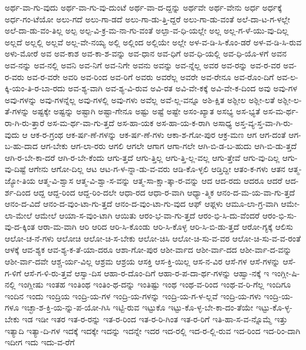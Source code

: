 {ಅರ್ಥ-ವಾ-ಗು-ವುದು
ಅರ್ಥ-ವಾ-ಗು-ವು-ದುಂಟೆ
ಅರ್ಥ-ವಾ-ದ-ದ್ದನ್ನು
ಅರ್ಥವೇ
ಅರ್ಥ-ವೇನು
ಅರ್ಧ
ಅರ್ಧಕ್ಕೆ
ಅರ್ಧ-ಗಂ-ಟೆಯೋ
ಅಲು-ಗದೆ
ಅಲು-ಗಾ-ಡದೆ
ಅಲು-ಗಾ-ಡು-ತ್ತಿ-ದ್ದರೆ
ಅಲು-ಗಾ-ಡು-ವಂತೆ
ಅಲೆ-ದಾ-ಟ-ಗ-ಳಲ್ಲೇ
ಅಲೆ-ದಾ-ಡು-ವಂ-ತಿಲ್ಲ
ಅಲ್ಪ
ಅಲ್ಪ-ವಿ-ಕ್ರ-ಮ-ನಾ-ಗು-ವಂತೆ
ಅಲ್ಪಾ-ವ-ಧಿ-ಯಲ್ಲೇ
ಅಲ್ಲ
ಅಲ್ಲ-ಗ-ಳೆ-ಯು-ವು-ದಿಲ್ಲ
ಅಲ್ಲದೆ
ಅಲ್ಲಲ್ಲಿ
ಅಲ್ಲವೆ
ಅಲ್ಲ-ವೇ-ನಯ್ಯ
ಅಲ್ಲಿ
ಅಲ್ಲಿಂದ
ಅಲ್ಲಿಯೇ
ಅಲ್ಲೇ
ಅಳ-ವ-ಡಿ-ಸಿ-ಕೊಂ-ಡರೆ
ಅಳ-ವ-ಡಿ-ಸಿ-ರುವ
ಅಳು-ಮೋರೆ
ಅವ
ಅವ-ಕಾಶ
ಅವ-ಕಾ-ಶ-ವನ್ನು
ಅವ-ಧಾನ
ಅವ-ಧಿಗೆ
ಅವ-ಧಿ-ಯಲ್ಲಿ
ಅವ-ಧಿ-ಯೊ-ಳಗೆ
ಅವನ
ಅವ-ನನ್ನು
ಅವ-ನಲ್ಲಿ
ಅವನಿ
ಅವ-ನಿಗೆ
ಅವ-ನಿಗೇ
ಅವನು
ಅವನ್ನು
ಅವ-ನ್ನೆಲ್ಲ
ಅವರ
ಅವ-ರನ್ನು
ಅವ-ರ-ವರ
ಅವ-ರ-ವರು
ಅವ-ರ-ವರೇ
ಅವರಿ
ಅವ-ರಿಂದ
ಅವ-ರಿಗೆ
ಅವರು
ಅವರೆಲ್ಲ
ಅವರೇ
ಅವ-ರೇನೂ
ಅವ-ರೊಂ-ದಿಗೆ
ಅವ-ಲ-ಕ್ಕಿ-ಯಂ-ತಿ-ರ-ಬಾ-ರದು
ಅವ-ಶ್ಯ-ವಾಗಿ
ಅವ-ಶ್ಯ-ವಿ-ರುವ
ಅವಿ-ರತ
ಅವಿ-ವೇ-ಕಕ್ಕೆ
ಅವಿ-ವೇ-ಕ-ದಿಂದ
ಅವು
ಅವು-ಗಳ
ಅವು-ಗಳನ್ನು
ಅವು-ಗಳನ್ನೆಲ್ಲ
ಅವು-ಗಳಲ್ಲಿ
ಅವು-ಗಳು
ಅವೆಲ್ಲ
ಅವೆ-ಲ್ಲ-ವನ್ನೂ
ಅಶಿ-ಕ್ಷಿತ
ಅಶ್ಲೀಲ
ಅಶ್ಲೀ-ಲತೆ
ಅಶ್ಲೀ-ಲ-ತೆ-ಗಳನ್ನು
ಅಷ್ಟಕ್ಕೇ
ಅಷ್ಟನ್ನು
ಅಷ್ಟಾಗಿ
ಅಷ್ಟಾ-ಗೇನೂ
ಅಷ್ಟು
ಅಷ್ಟೆ
ಅಷ್ಟೇ
ಅಸಂ-ಖ್ಯಾತ
ಅಸಭ್ಯ
ಅಸ-ಭ್ಯತೆ
ಅಸ-ಮ-ರ್ಥ-ರಾ-ಗಿ-ರು-ತ್ತಾರೆ
ಅಸ-ಮ-ರ್ಥ-ವಾ-ಗು-ತ್ತದೆ
ಅಸ-ಹಾ-ಯಕ
ಅಸ-ಹಾ-ಯ-ಕ-ರಾಗಿ
ಅಸಾಧ್ಯ
ಅಸ್ತ-ವ್ಯ-ಸ್ತ-ವಾ-ಗಿ-ರು-ವುದು
ಆ
ಆಕ-ರ-ಗ್ರಂಥ
ಆಕ-ರ್ಷ-ಣೆ-ಗಳನ್ನು
ಆಕ-ರ್ಷ-ಣೆ-ಗಳು
ಆಕಾ-ಶ-ಗೋ-ಪುರ
ಆಕ್ರ-ಮಣ
ಆಗ
ಆಗ-ದಂತೆ
ಆಗ-ಬ-ಹು-ದಾದ
ಆಗ-ಬೇಕು
ಆಗ-ಲಾ-ರರು
ಆಗಲಿ
ಆಗಲೇ
ಆಗಾಗ
ಆಗಾ-ಗಲೇ
ಆಗಿ-ಬಿ-ಡ-ಬ-ಹುದು
ಆಗಿ-ಬಿ-ಡು-ತ್ತದೆ
ಆಗಿ-ರ-ಬೇ-ಕಾ-ದರೆ
ಆಗಿ-ರ-ಬೇ-ಕೆಂದು
ಆಗು-ತ್ತದೆ
ಆಗು-ತ್ತಿಲ್ಲ
ಆಗು-ತ್ತಿ-ಲ್ಲ-ವಲ್ಲ
ಆಗು-ತ್ತೇವೆ
ಆಗು-ವು-ದಿಲ್ಲ
ಆಗು-ವು-ದಿಷ್ಟೆ
ಆಗೇನು
ಆಗೋ-ದಿಲ್ಲ
ಆಟ
ಆಟ-ಗ-ಳ-ನ್ನಾ-ಡು-ವ-ವರು
ಆಡಿ-ಕೊ-ಳ್ಳಲಿ
ಆಡ್ತಿದ್ದೀ
ಆತಂ-ಕ-ಗಳು
ಆತನ
ಆತ್ಮ-ಜ್ಯೋ-ತಿಯ
ಆತ್ಮ-ವಿ-ಶ್ವಾಸ
ಆತ್ಮ-ವಿ-ಶ್ವಾ-ಸ-ವನ್ನು
ಆತ್ಮ-ಸಾ-ಕ್ಷಾ-ತ್ಕಾ-ರ-ವನ್ನು
ಆದ
ಆದ-ರದು
ಆದರೂ
ಆದರೆ
ಆದ-ರ್ಶ-ದಿಂದ
ಆದ್ದ
ಆದ್ದ-ರಿಂದ
ಆದ್ದ-ರಿಂ-ದಲೇ
ಆಧಾ-ರದ
ಆಧಾ-ರ-ವಾಗಿ
ಆಧ್ಯಾ-ತ್ಮಿಕ
ಆನಂ-ದ-ಮ-ಯ-ವಾ-ಗು-ತ್ತದೆ
ಆನಂ-ದ-ವಿದೆ
ಆನಂ-ದ-ವುಂ-ಟಾ-ಗು-ತ್ತದೆ
ಆನಂ-ದ-ವುಂ-ಟಾ-ಗು-ವುದ
ಆಫ್
ಆಫ್ಗಳು
ಆಮೂ-ಲಾ-ಗ್ರ-ವಾಗಿ
ಆಮೇ-ಲಾ-ಮೇಲೆ
ಆಮೇಲೆ
ಆಯಾ-ಸ-ವುಂ-ಟಾಗಿ
ಆಯಿತು
ಆರಂ-ಭ-ವಾ-ಗು-ತ್ತದೆ
ಆರಂ-ಭಿ-ಸಿ-ದು-ವೆಂದರೆ
ಆರಂ-ಭಿ-ಸು-ವು-ದ-ಕ್ಕಿಂತ
ಆರಾ-ಮ-ವಾಗಿ
ಆರಿ
ಆರಿದ
ಆರಿ-ಸಿ-ಕೊಂಡು
ಆರಿ-ಸಿ-ಕೊಳ್ಳ
ಆರಿ-ಸಿ-ಬಿ-ಡು-ತ್ತದೆ
ಆರೋ-ಗ್ಯಕ್ಕೆ
ಆಲಿಸು
ಆಲೋ-ಚ-ನೆ-ಗಳು
ಆಲೋಚಿ
ಆಲೋ-ಚಿ-ಸ-ಬೇಕು
ಆಲೋ-ಚಿಸಿ
ಆಲೋ-ಚಿ-ಸು-ವ-ವರ
ಆಲೋ-ಚಿ-ಸು-ವ-ವ-ರಂತೆ
ಆಳಕ್ಕೆ
ಆವ-ಶ್ಯಕ
ಆವ-ಶ್ಯ-ಕ-ತೆ-ಯಾ-ದರೂ
ಆಶಾ-ಗೋ-ಪುರ
ಆಶೀ-ರ್ವಾದ
ಆಶೀ-ರ್ವಾ-ದದ
ಆಶೀ-ರ್ವಾ-ದ-ವನ್ನು
ಆಶೀ-ರ್ವಾ-ದವೇ
ಆಶ್ಚ-ರ್ಯ-ವಿಲ್ಲ
ಆಶ್ರಮ
ಆಶ್ರಯ
ಆಸಕ್ತಿ
ಆಸ-ಕ್ತಿ-ಯಿಲ್ಲ
ಆಸ-ನ-ವಿರ
ಆಸೆ-ಗಳ
ಆಸೆ-ಗಳನ್ನು
ಆಸೆ-ಗ-ಳಿಗೆ
ಆಸೆ-ಗ-ಳಿ-ರು-ತ್ತವೆ
ಆಸ್ವಾ-ದಿಸ
ಆಹಾ-ರ-ದೊಂ-ದಿಗೆ
ಆಹಾ-ರ-ಪ-ದಾ-ರ್ಥ-ಗಳನ್ನು
ಆಹ್ವಾ-ನಕ್ಕೆ
ಇ
ಇಂಗ್ಲೀ-ಷಿ-ನಲ್ಲಿ
ಇಂಗ್ಲೀಷು
ಇಂತಹ
ಇಂತಿಂಥ
ಇಂತಿಂ-ಥ-ದನ್ನು
ಇಂತಿಷ್ಟು
ಇಂಥ
ಇಂಥ-ವ-ರಿಂದ
ಇಂಥ-ವ-ರಿ-ಗೆಲ್ಲ
ಇಂದಿಗೂ
ಇಂದಿನ
ಇಂದು
ಇಂದ್ರಿಯ
ಇಂದ್ರಿ-ಯ-ಗಳ
ಇಂದ್ರಿ-ಯ-ಗಳನ್ನು
ಇಂದ್ರಿ-ಯ-ಗ-ಳ-ಲ್ಲವೆ
ಇಂದ್ರಿ-ಯ-ಗಳು
ಇಂದ್ರಿ-ಯ-ಗಳೂ
ಇಚ್ಛಾ-ಶ-ಕ್ತಿ-ಯ-ನ್ನು-ಪ-ಯೋ-ಗಿಸಿ
ಇಟ್ಟಿ-ರುವ
ಇಟ್ಟುಕೊ
ಇಟ್ಟು-ಕೊ-ಳ್ಳ-ಬೇ-ಕಾ-ದಂ-ತೆಯೇ
ಇಟ್ಟು-ಕೊ-ಳ್ಳ-ಬೇಕು
ಇಡ
ಇಡೀ
ಇತರ
ಇತ-ರ-ರನ್ನು
ಇತ-ರ-ರಿಂದ
ಇತ-ರ-ರಿ-ಗಿಂತ
ಇತ-ರ-ರಿಗೆ
ಇತಿ-ಹಾ-ಸ-ವ-ನ್ನೊಮ್ಮೆ
ಇತ್ತು
ಇತ್ಯಾದಿ
ಇತ್ಯಾ-ದಿ-ಗಳ
ಇದಕ್ಕೆ
ಇದಕ್ಕೇ
ಇದನ್ನು
ಇದನ್ನೇ
ಇದರ
ಇದ-ರಲ್ಲಿ
ಇದ-ರ-ಲ್ಲಿ-ರುವ
ಇದ-ರಿಂದ
ಇದ-ರಿಂ-ದಾಗಿ
ಇದೀಗ
ಇದು
ಇದು-ವ-ರೆಗೆ
}
